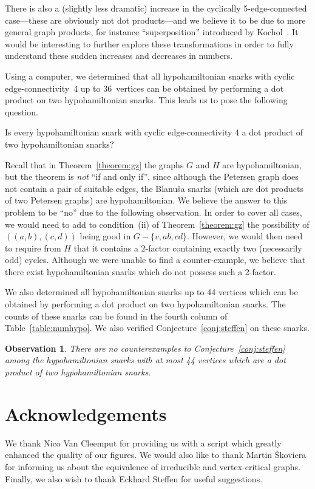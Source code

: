\documentclass{amcjoucc}
\newtheorem{observation}[thm]{Observation}
\begin{document}
There is also a (slightly less dramatic) increase in the cyclically 5-edge-connected case---these are obviously not dot products---and we believe it to be due to more general graph products, for instance ``superposition'' introduced by Kochol~\cite{Ko96}. It would be interesting to further explore these transformations in order to fully understand these sudden increases and decreases in numbers.

Using a computer, we determined that all hypohamiltonian snarks with cyclic edge-connectivity~4 up to 36~vertices can be obtained by performing a dot product on two hypohamiltonian snarks. This leads us to pose the following question.


\begin{problem}
Is every hypohamiltonian snark with cyclic edge-connectivity 4 a dot product of two hypohamiltonian snarks?
\end{problem}

Recall that in Theorem~\ref{theorem:gz} the graphs $G$ and $H$ are hypohamiltonian, but the theorem is \emph{not} ``if and only if'', since although the Petersen graph does not contain a pair of suitable edges, the Blanu\v{s}a snarks (which are dot products of two Petersen graphs) are hypohamiltonian. We believe the answer to this problem to be ``no'' due to the following observation. In order to cover all cases, we would need to add to condition~(ii) of Theorem~\ref{theorem:gz} the possibility of $((a,b),(c,d))$ being good in $G - \{ v, ab, cd \}$. However, we would then need to require from $H$ that it contains a 2-factor containing exactly two (necessarily odd) cycles. Although we were unable to find a counter-example, we believe that there exist hypohamiltonian snarks which do not possess such a 2-factor. 

We also determined all hypohamiltonian snarks up to 44 vertices which can be obtained by performing a dot product on two hypohamiltonian snarks. The counts of these snarks can be found in the fourth column of Table~\ref{table:numhypo}. We also verified Conjecture~\ref{conj:steffen} on these snarks.

\begin{observation}
There are no counterexamples to Conjecture~\ref{conj:steffen} among the hypohamiltonian snarks with at most 44 vertices which are a dot product of two hypohamiltonian snarks.
\end{observation}




\section*{Acknowledgements}
We thank Nico Van Cleemput for providing us with a script which greatly enhanced the quality of our figures. We would also like to thank Martin \v{S}koviera for informing us about the equivalence of irreducible and vertex-critical graphs. Finally, we also wish to thank Eckhard Steffen for useful suggestions.
\end{document}
